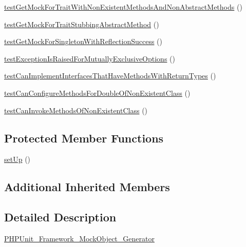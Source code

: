 \begin{DoxyCompactItemize}
\item 
\mbox{\hyperlink{class_framework___mock_object___generator_test_aae96e824cd86aea07bf10017467bbedf}{test\+Get\+Mock\+For\+Trait\+With\+Non\+Existent\+Methods\+And\+Non\+Abstract\+Methods}} ()
\item 
\mbox{\hyperlink{class_framework___mock_object___generator_test_a2b47f1d64978757baef3dffc99dfc125}{test\+Get\+Mock\+For\+Trait\+Stubbing\+Abstract\+Method}} ()
\item 
\mbox{\hyperlink{class_framework___mock_object___generator_test_a979b8c1a4c18b3e66e37121cd1d804db}{test\+Get\+Mock\+For\+Singleton\+With\+Reflection\+Success}} ()
\item 
\mbox{\hyperlink{class_framework___mock_object___generator_test_a25723f7d38d24e520b567b27e4de187b}{test\+Exception\+Is\+Raised\+For\+Mutually\+Exclusive\+Options}} ()
\item 
\mbox{\hyperlink{class_framework___mock_object___generator_test_a8c2b9c9d4dec4e4452a59406cf3158c4}{test\+Can\+Implement\+Interfaces\+That\+Have\+Methods\+With\+Return\+Types}} ()
\item 
\mbox{\hyperlink{class_framework___mock_object___generator_test_ae6b88d5d1eab8b9bf258d12a50cb5f20}{test\+Can\+Configure\+Methods\+For\+Double\+Of\+Non\+Existent\+Class}} ()
\item 
\mbox{\hyperlink{class_framework___mock_object___generator_test_a17cd6b1e0ab2dc99848020dfb0bc36b5}{test\+Can\+Invoke\+Methods\+Of\+Non\+Existent\+Class}} ()
\end{DoxyCompactItemize}
\subsection*{Protected Member Functions}
\begin{DoxyCompactItemize}
\item 
\mbox{\hyperlink{class_framework___mock_object___generator_test_a0bc688732d2b3b162ffebaf7812e78da}{set\+Up}} ()
\end{DoxyCompactItemize}
\subsection*{Additional Inherited Members}


\subsection{Detailed Description}
\mbox{\hyperlink{class_p_h_p_unit___framework___mock_object___generator}{P\+H\+P\+Unit\+\_\+\+Framework\+\_\+\+Mock\+Object\+\_\+\+Generator}}

